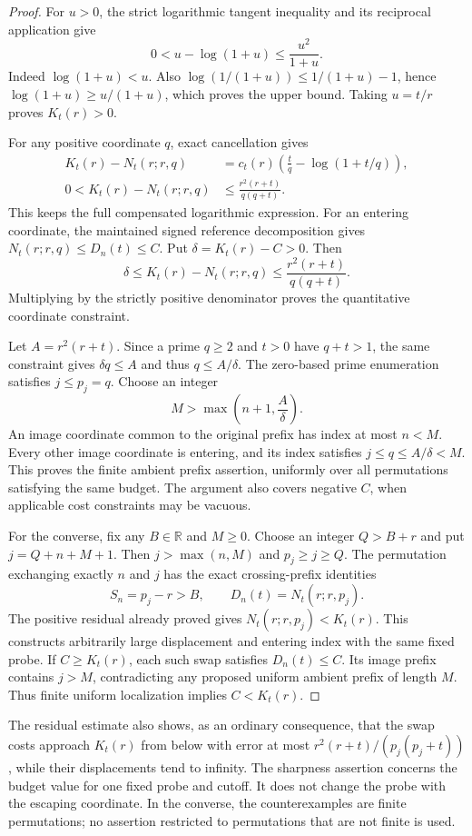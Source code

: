 \documentclass[11pt]{article}
\theoremstyle{definition}
\begin{document}
\begin{proof}
For $u>0$, the strict logarithmic tangent inequality and its
reciprocal application give
\[
 0<u-\log(1+u)\le\frac{u^2}{1+u}.
\]
Indeed $\log(1+u)<u$. Also
$\log(1/(1+u))\le1/(1+u)-1$, hence
$\log(1+u)\ge u/(1+u)$, which proves the upper bound.
Taking $u=t/r$ proves $K_t(r)>0$.

For any positive coordinate $q$, exact cancellation gives
\[
 \begin{split}
 K_t(r)-N_t(r;r,q)
  &=c_t(r)\left(\frac tq-\log(1+t/q)\right),\\
 0<K_t(r)-N_t(r;r,q)
  &\le\frac{r^2(r+t)}{q(q+t)}.
 \end{split}
\]
This keeps the full compensated logarithmic expression.
For an entering coordinate, the maintained signed reference
decomposition gives $N_t(r;r,q)\le D_n(t)\le C$.
Put $\delta=K_t(r)-C>0$. Then
\[
 \delta\le K_t(r)-N_t(r;r,q)
     \le\frac{r^2(r+t)}{q(q+t)}.
\]
Multiplying by the strictly positive denominator proves the
quantitative coordinate constraint.

Let $A=r^2(r+t)$. Since a prime $q\ge2$ and $t>0$ have
$q+t>1$, the same constraint gives $\delta q\le A$ and thus
$q\le A/\delta$. The zero-based prime enumeration satisfies
$j\le p_j=q$. Choose an integer
\[
 M>\max\left(n+1,\frac A\delta\right).
\]
An image coordinate common to the original prefix has index at most
$n<M$. Every other image coordinate is entering, and its index
satisfies $j\le q\le A/\delta<M$. This proves the finite ambient
prefix assertion, uniformly over all permutations satisfying the
same budget. The argument also covers negative $C$, when applicable
cost constraints may be vacuous.

For the converse, fix any $B\in\mathbb R$ and $M\ge0$.
Choose an integer $Q>B+r$ and put $j=Q+n+M+1$.
Then $j>\max(n,M)$ and $p_j\ge j\ge Q$.
The permutation exchanging exactly $n$ and $j$ has the exact
crossing-prefix identities
\[
 S_n=p_j-r>B,\qquad D_n(t)=N_t(r;r,p_j).
\]
The positive residual already proved gives
$N_t(r;r,p_j)<K_t(r)$. This constructs arbitrarily large
displacement and entering index with the same fixed probe.
If $C\ge K_t(r)$, each such swap satisfies $D_n(t)\le C$.
Its image prefix contains $j>M$, contradicting any proposed
uniform ambient prefix of length $M$.
Thus finite uniform localization implies $C<K_t(r)$.
\end{proof}

The residual estimate also shows, as an ordinary consequence,
that the swap costs approach $K_t(r)$ from below with error at most
$r^2(r+t)/(p_j(p_j+t))$, while their displacements tend to infinity.
The sharpness assertion concerns the budget value for one fixed
probe and cutoff. It does not change the probe with the escaping
coordinate. In the converse, the counterexamples are finite
permutations; no assertion restricted to permutations that are not
finite is used.
\end{document}
